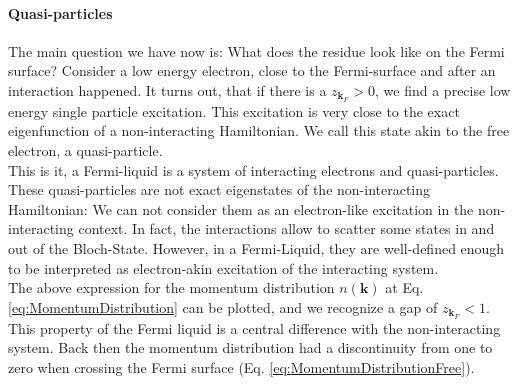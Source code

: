 \documentclass[../main.tex]{subfile}
\begin{document}
\paragraph{Quasi-particles}$~$\\

The main question we have now is: What does the residue look like on the Fermi surface? Consider a low energy electron, close to the Fermi-surface and 
after an interaction happened. It turns out, that if there is a $z_{\bm{k}_F}>0$, we find a precise low energy single particle excitation. This excitation is very close
to the exact eigenfunction of a non-interacting Hamiltonian. We call this state akin to the free electron, a quasi-particle.\\

This is it, a Fermi-liquid is a system of interacting electrons and quasi-particles. 
These quasi-particles are not exact eigenstates of the non-interacting Hamiltonian:
We can not consider them as an electron-like excitation in the non-interacting context. In fact,
the interactions allow to scatter some states in and out of the Bloch-State. However, in a Fermi-Liquid, they are well-defined
enough to be interpreted as electron-akin excitation of the interacting system. \\

The above expression for the momentum distribution $n(\bm{k})$ at Eq. \ref{eq:MomentumDistribution} can be plotted,
 and we recognize a gap of $z_{\bm{k}_F}<1$. 
 This property of the Fermi liquid is a central difference with the non-interacting
system. Back then the momentum distribution had a discontinuity from one to zero when crossing the Fermi surface (Eq. \ref{eq:MomentumDistributionFree}).\\
\end{document}
